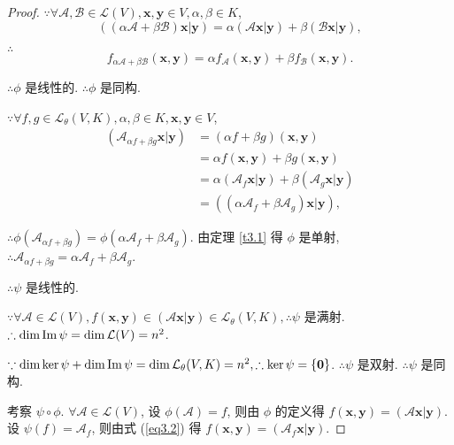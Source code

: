 \documentclass{ctexart}
\begin{document}
\begin{proof}
    $\because\forall\mathcal{A},\mathcal{B}\in\mathcal{L}(V),\boldsymbol{x},\boldsymbol{y}\in V,\alpha,\beta\in K$,
    \[((\alpha\mathcal{A}+\beta\mathcal{B})\boldsymbol{x}|\boldsymbol{y})=\alpha(\mathcal{A}\boldsymbol{x}|\boldsymbol{y})+\beta(\mathcal{B}\boldsymbol{x}|\boldsymbol{y}),\]
    
    $\therefore$
    \[f_{\alpha\mathcal{A}+\beta\mathcal{B}}(\boldsymbol{x},\boldsymbol{y})=\alpha f_{\mathcal{A}}(\boldsymbol{x},\boldsymbol{y})+\beta f_{\mathcal{B}}(\boldsymbol{x},\boldsymbol{y}).\]

    $\therefore\phi$ 是线性的. $\therefore\phi$ 是同构.

    $\because\forall f,g\in\mathcal{L}_\theta(V,K),\alpha,\beta\in K,\boldsymbol{x},\boldsymbol{y}\in V$,
    \begin{align*}
        (\mathcal{A}_{\alpha f+\beta g}\boldsymbol{x}|\boldsymbol{y}) & =(\alpha f+\beta g)(\boldsymbol{x},\boldsymbol{y}) \\
        & =\alpha f(\boldsymbol{x},\boldsymbol{y})+\beta g(\boldsymbol{x},\boldsymbol{y}) \\
        & =\alpha(\mathcal{A}_f\boldsymbol{x}|\boldsymbol{y})+\beta(\mathcal{A}_g\boldsymbol{x}|\boldsymbol{y}) \\
        & =((\alpha\mathcal{A}_f+\beta\mathcal{A}_g)\boldsymbol{x}|\boldsymbol{y}),
    \end{align*}

    $\therefore\phi(\mathcal{A}_{\alpha f+\beta g})=\phi(\alpha\mathcal{A}_f+\beta\mathcal{A}_g)$. 由定理 \ref{t3.1} 得 $\phi$ 是单射, $\therefore\mathcal{A}_{\alpha f+\beta g}=\alpha\mathcal{A}_f+\beta\mathcal{A}_g$.

    $\therefore\psi$ 是线性的.

    $\because\forall\mathcal{A}\in\mathcal{L}(V),f(\boldsymbol{x},\boldsymbol{y})\in(\mathcal{A}\boldsymbol{x}|\boldsymbol{y})\in\mathcal{L}_\theta(V,K),\therefore\psi$ 是满射. $\therefore\dim\operatorname{Im} \psi=\dim\mathcal{L}(V)=n^2$.

    $\because\dim\ker\psi+\dim\operatorname{Im} \psi=\dim\mathcal{L}_\theta(V,K)=n^2,\therefore\ker\psi=\{\boldsymbol{0}\}$. $\therefore\psi$ 是双射. $\therefore\psi$ 是同构.

    考察 $\psi\circ\phi$. $\forall\mathcal{A}\in\mathcal{L}(V)$, 设 $\phi(\mathcal{A})=f$, 则由 $\phi$ 的定义得 $f(\boldsymbol{x},\boldsymbol{y})=(\mathcal{A}\boldsymbol{x}|\boldsymbol{y})$. 设 $\psi(f)=\mathcal{A}_f$, 则由式 (\ref{eq3.2}) 得 $f(\boldsymbol{x},\boldsymbol{y})=(\mathcal{A}_f\boldsymbol{x}|\boldsymbol{y})$.
    

\end{proof}
\end{document}
